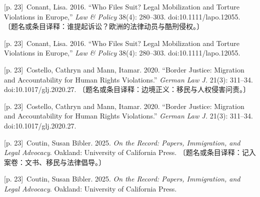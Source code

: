 \documentclass[10pt,a4paper]{article}
\begin{document}
\noindent\begin{minipage}{\textwidth}\begin{minipage}[t]{\dimexpr.5\textwidth-4mm\relax}{\scriptsize\color{gray} [p. 23]}\ Conant, Lisa. 2016. “Who Files Suit? Legal Mobilization and Torture Violations in Europe,” \textit{Law \& Policy} 38(4): 280–303. doi:10.1111/lapo.12055. 〔题名或条目译释：谁提起诉讼？欧洲的法律动员与酷刑侵权。〕\par\end{minipage}\hfill\begin{minipage}[t]{\dimexpr.5\textwidth-4mm\relax}{\scriptsize\color{gray} [p. 23]}\ Conant, Lisa. 2016. “Who Files Suit? Legal Mobilization and Torture Violations in Europe,” \textit{Law \& Policy} 38(4): 280–303. doi:10.1111/lapo.12055.\par\end{minipage}\end{minipage}\par
\noindent\begin{minipage}{\textwidth}\begin{minipage}[t]{\dimexpr.5\textwidth-4mm\relax}{\scriptsize\color{gray} [p. 23]}\ Costello, Cathryn and Mann, Itamar. 2020. “Border Justice: Migration and Accountability for Human Rights Violations.” \textit{German Law J.} 21(3): 311–34. doi:10.1017/glj.2020.27. 〔题名或条目译释：边境正义：移民与人权侵害问责。〕\par\end{minipage}\hfill\begin{minipage}[t]{\dimexpr.5\textwidth-4mm\relax}{\scriptsize\color{gray} [p. 23]}\ Costello, Cathryn and Mann, Itamar. 2020. “Border Justice: Migration and Accountability for Human Rights Violations.” \textit{German Law J.} 21(3): 311–34. doi:10.1017/glj.2020.27.\par\end{minipage}\end{minipage}\par
\noindent\begin{minipage}{\textwidth}\begin{minipage}[t]{\dimexpr.5\textwidth-4mm\relax}{\scriptsize\color{gray} [p. 23]}\ Coutin, Susan Bibler. 2025. \textit{On the Record: Papers, Immigration, and Legal Advocacy}. Oakland: University of California Press. 〔题名或条目译释：记入案卷：文书、移民与法律倡导。〕\par\end{minipage}\hfill\begin{minipage}[t]{\dimexpr.5\textwidth-4mm\relax}{\scriptsize\color{gray} [p. 23]}\ Coutin, Susan Bibler. 2025. \textit{On the Record: Papers, Immigration, and Legal Advocacy}. Oakland: University of California Press.\par\end{minipage}\end{minipage}\par
\end{document}
